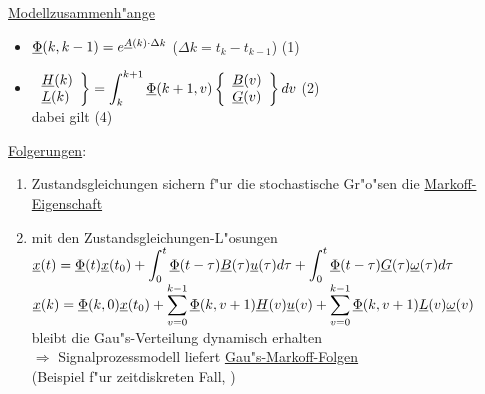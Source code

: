 \documentclass[openany,a4paper,11pt]{book}
\begin{document}
\uline{Modellzusammenh"ange} \begin{itemize}
    \item $\uline{\Phi}(k,k-1)=e^{\uline{A}(k)\cdot \Delta k}$ \quad ($\Delta k=t_k-t_{k-1}$) \quad (1)
    \item $\displaystyle\left. \begin{array}{l}
          \uline{H}(k) \\ \uline{L}(k) \\ \end{array} \right \} =\int_k^{k+1}\uline{\Phi}(k+1,v)\left\{ \begin{array}{l}
          \uline{B}(v)\\ \uline{G}(v) \\ \end{array} \right \} dv$  \quad (2)\\
          dabei gilt  \quad (4)
\end{itemize}
\uline{Folgerungen}:\begin{enumerate}
    \item Zustandsgleichungen sichern f"ur die stochastische Gr"o"sen die \uline{Markoff-Eigenschaft}
    \item mit den Zustandsgleichungen-L"osungen\\
    $\displaystyle\uline{x}(t)=\uline{\Phi}(t)\uline{x}(t_0)+\int_0^t\uline{\Phi}(t-\tau)\uline{B}(\tau)\uline{u}(\tau)d\tau+\int_0^t\uline{\Phi}(t-\tau)\uline{G}(\tau)\uline{\omega}(\tau)d\tau$\\
    $\displaystyle\uline{x}(k)=\uline{\Phi}(k,0)\uline{x}(t_0)+\sum_{v=0}^{k-1}\uline{\Phi}(k,v+1)\uline{H}(v)\uline{u}(v)+\sum_{v=0}^{k-1}\uline{\Phi}(k,v+1)\uline{L}(v)\uline{\omega}(v)$\\
    bleibt die Gau"s-Verteilung dynamisch erhalten\\
    $\Rightarrow$ Signalprozessmodell liefert \uline{Gau"s-Markoff-Folgen}\\[3pt]
    (Beispiel f"ur zeitdiskreten Fall, )
\end{enumerate}
\end{document}
